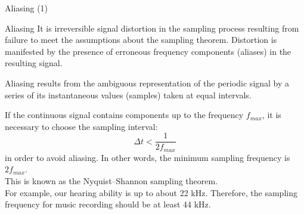 \documentclass[10pt,aspectratio=169,notes]{beamer} %
\begin{document}
\begin{frame}{Aliasing (1)}
	\begin{alertblock}{Aliasing}
		It is irreversible signal distortion in the sampling process resulting from failure to meet the assumptions about the sampling theorem. 
		Distortion is manifested by the presence of erroneous frequency components (aliases) in the resulting signal.
	\end{alertblock}
	Aliasing results from the ambiguous representation of the periodic signal by a series of its instantaneous values (samples) taken at equal intervals.
	
	If the continuous signal contains components up to the frequency \(f_{max}\), it is necessary to choose the \alert{sampling interval}:
	\begin{equation*}
	\boxed{\Delta t < \frac{1}{2 f_{max}}}
	\end{equation*}
	in order to avoid aliasing. In other words, the \alert{minimum sampling frequency is \(2 f_{max}\)}.\\
	This is known as the \alert{Nyquist–Shannon sampling theorem}.\\
	For example, our hearing ability is up to about 22 kHz.
	Therefore, the sampling frequency for music recording should be at least 44 kHz.
\end{frame}
\end{document}
